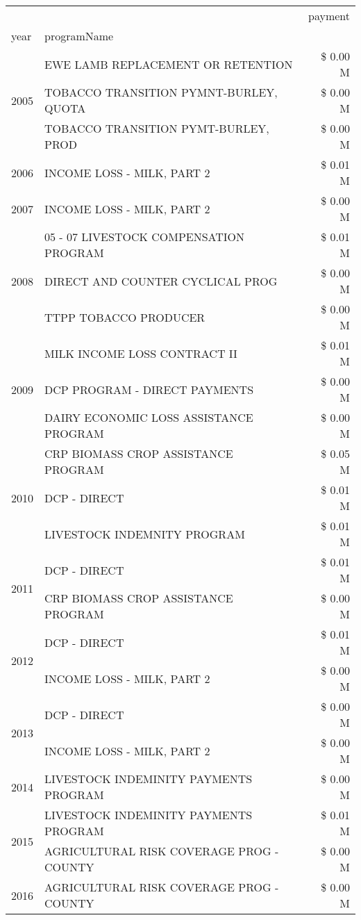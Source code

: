 \begin{tabular}{llr}
\toprule
 &  & payment \\
year & programName &  \\
\midrule
\multirow[t]{3}{*}{2005} & EWE LAMB REPLACEMENT OR RETENTION & \$ 0.00 M \\
 & TOBACCO TRANSITION PYMNT-BURLEY, QUOTA & \$ 0.00 M \\
 & TOBACCO TRANSITION PYMT-BURLEY, PROD & \$ 0.00 M \\
\cline{1-3}
2006 & INCOME LOSS - MILK, PART 2 & \$ 0.01 M \\
\cline{1-3}
2007 & INCOME LOSS - MILK, PART 2 & \$ 0.00 M \\
\cline{1-3}
\multirow[t]{3}{*}{2008} & 05 - 07 LIVESTOCK COMPENSATION PROGRAM & \$ 0.01 M \\
 & DIRECT AND COUNTER CYCLICAL PROG & \$ 0.00 M \\
 & TTPP TOBACCO PRODUCER & \$ 0.00 M \\
\cline{1-3}
\multirow[t]{3}{*}{2009} & MILK INCOME LOSS CONTRACT II & \$ 0.01 M \\
 & DCP PROGRAM - DIRECT PAYMENTS & \$ 0.00 M \\
 & DAIRY ECONOMIC LOSS ASSISTANCE PROGRAM & \$ 0.00 M \\
\cline{1-3}
\multirow[t]{3}{*}{2010} & CRP BIOMASS CROP ASSISTANCE PROGRAM & \$ 0.05 M \\
 & DCP - DIRECT & \$ 0.01 M \\
 & LIVESTOCK INDEMNITY PROGRAM & \$ 0.01 M \\
\cline{1-3}
\multirow[t]{2}{*}{2011} & DCP - DIRECT & \$ 0.01 M \\
 & CRP BIOMASS CROP ASSISTANCE PROGRAM & \$ 0.00 M \\
\cline{1-3}
\multirow[t]{2}{*}{2012} & DCP - DIRECT & \$ 0.01 M \\
 & INCOME LOSS - MILK, PART 2 & \$ 0.00 M \\
\cline{1-3}
\multirow[t]{2}{*}{2013} & DCP - DIRECT & \$ 0.00 M \\
 & INCOME LOSS - MILK, PART 2 & \$ 0.00 M \\
\cline{1-3}
2014 & LIVESTOCK INDEMINITY PAYMENTS PROGRAM & \$ 0.00 M \\
\cline{1-3}
\multirow[t]{2}{*}{2015} & LIVESTOCK INDEMINITY PAYMENTS PROGRAM & \$ 0.01 M \\
 & AGRICULTURAL RISK COVERAGE PROG - COUNTY & \$ 0.00 M \\
\cline{1-3}
\multirow[t]{2}{*}{2016} & AGRICULTURAL RISK COVERAGE PROG - COUNTY & \$ 0.00 M \\

\end{tabular}
